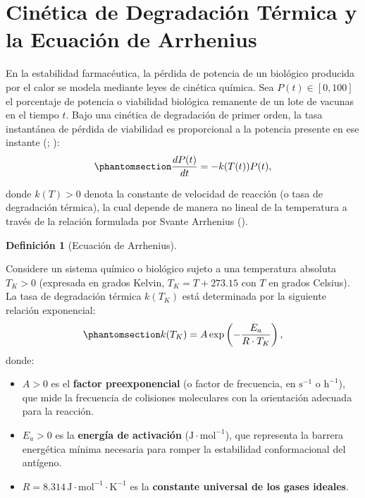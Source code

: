 \documentclass[
  spanish,
  us-letterpaper,
]{scrreprt}
\providecommand{\tightlist}{%
  \setlength{\itemsep}{0pt}\setlength{\parskip}{0pt}}
\numberwithin{equation}{section}
\theoremstyle{plain}
\theoremstyle{plain}
\theoremstyle{definition}
\newtheorem{definition}{Definición}[chapter]
\theoremstyle{plain}
\theoremstyle{remark}
\begin{document}
\section{Cinética de Degradación Térmica y la Ecuación de
Arrhenius}\label{sec-fundamento-arrhenius}

En la estabilidad farmacéutica, la pérdida de potencia de un biológico
producida por el calor se modela mediante leyes de cinética química. Sea
\(P(t) \in [0, 100]\) el porcentaje de potencia o viabilidad biológica
remanente de un lote de vacunas en el tiempo \(t\). Bajo una cinética de
degradación de primer orden, la tasa instantánea de pérdida de
viabilidad es proporcional a la potencia presente en ese instante
(;
):
\begin{equation}\phantomsection\label{eq-cinetica-primer-orden}{
\frac{dP(t)}{dt} = -k(T(t)) P(t),
}\end{equation}

donde \(k(T) > 0\) denota la constante de velocidad de reacción (o tasa
de degradación térmica), la cual depende de manera no lineal de la
temperatura a través de la relación formulada por Svante Arrhenius
().

\begin{definition}[Ecuación de
Arrhenius]\protect\hypertarget{def-ecuacion-arrhenius}{}\label{def-ecuacion-arrhenius}

Considere un sistema químico o biológico sujeto a una temperatura
absoluta \(T_K > 0\) (expresada en grados Kelvin, \(T_K = T + 273.15\)
con \(T\) en grados Celsius). La tasa de degradación térmica \(k(T_K)\)
está determinada por la siguiente relación exponencial:
\begin{equation}\phantomsection\label{eq-arrhenius-teorica}{
k(T_K) = A \exp\left( -\frac{E_a}{R \cdot T_K} \right),
}\end{equation} donde:

\begin{itemize}
\tightlist
\item
  \(A > 0\) es el \textbf{factor preexponencial} (o factor de
  frecuencia, en \(\text{s}^{-1}\) o \(\text{h}^{-1}\)), que mide la
  frecuencia de colisiones moleculares con la orientación adecuada para
  la reacción.
\item
  \(E_a > 0\) es la \textbf{energía de activación}
  (\(\text{J}\cdot\text{mol}^{-1}\)), que representa la barrera
  energética mínima necesaria para romper la estabilidad conformacional
  del antígeno.
\item
  \(R = 8.314\,\text{J}\cdot\text{mol}^{-1}\cdot\text{K}^{-1}\) es la
  \textbf{constante universal de los gases ideales}.
\end{itemize}

\end{definition}
\end{document}
